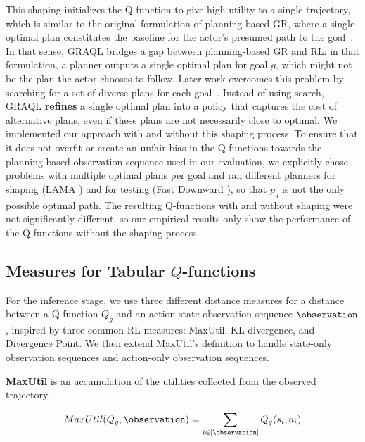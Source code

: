 \documentclass[letterpaper]{article} %
\begin{document}
This shaping initializes the Q-function to give high utility to a single trajectory, which is similar to the original formulation of planning-based GR, where a single optimal plan constitutes the baseline for the actor's presumed path to the goal~\cite{ramirez2009plan}. 
In that sense, GRAQL bridges a gap between planning-based GR and RL: in that formulation, a planner outputs a single optimal plan for goal $g$, which might not be the plan the actor chooses to follow. 
%
%
Later work overcomes this problem by searching for a set of diverse plans for each goal~\cite{sohrabi2016plan}. 
%
Instead of using search, GRAQL \textbf{refines} a single optimal plan into a  policy that captures the cost of alternative plans, even if these plans are not necessarily close to optimal. 
%
We implemented our approach with and without this shaping process.
To ensure that it does not overfit or create an unfair bias in the Q-functions towards the planning-based observation sequence used in our evaluation, we explicitly chose problems with multiple optimal plans per goal and ran different planners for shaping (LAMA \cite{richter2010lama}) and for testing (Fast Downward \cite{helmert2006fast}), so that $p_g$ is not the only possible optimal path. 
The resulting Q-functions with and without shaping were not significantly different, so our empirical results only show the performance of the Q-functions without the shaping process.


\subsection{Measures for Tabular $Q$-functions}
For the inference stage, we use three different distance measures for a distance between a Q-function $Q_g$ and an action-state observation sequence $\observation$, inspired by three common RL measures: MaxUtil, KL-divergence, and Divergence Point. 
We then extend MaxUtil's definition to handle state-only observation sequences and action-only observation sequences.

\noindent \textbf{MaxUtil} is an accumulation of the utilities collected from the observed trajectory. 

\begin{equation}
    MaxUtil(Q_g, \observation) = \displaystyle\sum\limits_{i \in |\observation|} Q_g(s_i,a_i)
\end{equation} 
\end{document}
